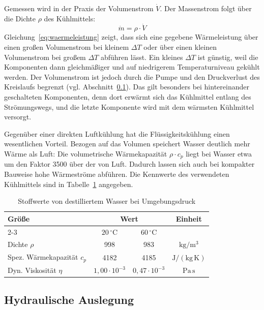 Gemessen wird in der Praxis der Volumenstrom $\dot{V}$. Der Massenstrom folgt
über die Dichte $\rho$ des Kühlmittels:
\begin{equation}
  \dot{m} = \rho \cdot \dot{V}
  \label{eq:massenstrom}
\end{equation}
Gleichung~\eqref{eq:waermeleistung} zeigt, dass sich eine gegebene Wärmeleistung
über einen großen Volumenstrom bei kleinem $\Delta T$ oder über einen kleinen
Volumenstrom bei großem $\Delta T$ abführen lässt. Ein kleines $\Delta T$ ist
günstig, weil die Komponenten dann gleichmäßiger und auf niedrigerem
Temperaturniveau gekühlt werden. Der Volumenstrom ist jedoch durch die Pumpe und
den Druckverlust des Kreislaufs begrenzt (vgl.
Abschnitt~\ref{subsec:hydraulik}). Das gilt besonders bei hintereinander
geschalteten Komponenten, denn dort erwärmt sich das Kühlmittel entlang des
Strömungswegs, und die letzte Komponente wird mit dem wärmsten Kühlmittel
versorgt.

Gegenüber einer direkten Luftkühlung hat die Flüssigkeitskühlung einen
wesentlichen Vorteil. Bezogen auf das Volumen speichert Wasser deutlich mehr
Wärme als Luft: Die volumetrische Wärmekapazität $\rho \cdot c_p$ liegt bei
Wasser etwa um den Faktor \num{3500} über der von Luft. Dadurch lassen sich auch
bei kompakter Bauweise hohe Wärmeströme abführen. Die Kennwerte des verwendeten
Kühlmittels sind in Tabelle~\ref{tab:stoffwerte} angegeben.

\begin{table}[htb]
  \centering
  \caption{Stoffwerte von destilliertem Wasser bei Umgebungsdruck}
  \label{tab:stoffwerte}
  \begin{tabular}{|l|c|c|c|}
    \hline
    Größe & \multicolumn{2}{c|}{Wert} & Einheit \\
    \cline{2-3}
          & $20\,^{\circ}\mathrm{C}$ & $60\,^{\circ}\mathrm{C}$ & \\
    \hline
    Dichte $\rho$              & 998  & 983  & $\mathrm{kg/m^3}$ \\
    \hline
    Spez. Wärmekapazität $c_p$ & 4182 & 4185 & $\mathrm{J/(kg\,K)}$ \\
    \hline
    Dyn. Viskosität $\eta$     & $1{,}00 \cdot 10^{-3}$ & $0{,}47 \cdot 10^{-3}$ & $\mathrm{Pa\,s}$ \\
    \hline
  \end{tabular}
\end{table}

\subsection{Hydraulische Auslegung}
\label{subsec:hydraulik}


